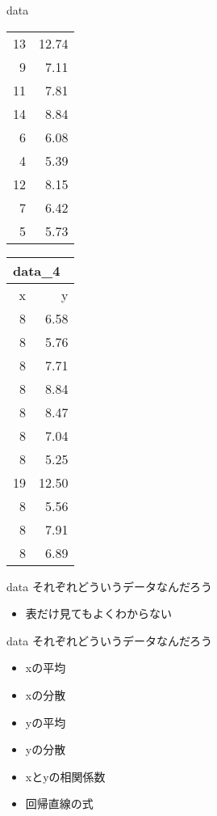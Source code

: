 \documentclass[
  ignorenonframetext,
]{beamer}
\providecommand{\tightlist}{%
  \setlength{\itemsep}{0pt}\setlength{\parskip}{0pt}}
\begin{document}
\begin{frame}{data}
\begin{tabular}{rr}
13 & 12.74\\
9 & 7.11\\
11 & 7.81\\
14 & 8.84\\
6 & 6.08\\
4 & 5.39\\
12 & 8.15\\
7 & 6.42\\
5 & 5.73\\
\bottomrule
\end{tabular}\hfill
\begin{tabular}{rr}
\multicolumn{2}{l}{data\_4}\\
\toprule
x & y\\
\midrule
8 & 6.58\\
8 & 5.76\\
8 & 7.71\\
8 & 8.84\\
8 & 8.47\\
8 & 7.04\\
8 & 5.25\\
19 & 12.50\\
8 & 5.56\\
8 & 7.91\\
8 & 6.89\\
\bottomrule
\end{tabular}
\end{frame}

\begin{frame}{data}
\protect\hypertarget{data-2}{}
それぞれどういうデータなんだろう

\begin{itemize}[<+->]
\tightlist
\item
  表だけ見てもよくわからない
\end{itemize}
\end{frame}

\begin{frame}{data}
\protect\hypertarget{data-3}{}
それぞれどういうデータなんだろう

\begin{itemize}[<+->]
\tightlist
\item
  xの平均
\item
  xの分散
\item
  yの平均
\item
  yの分散
\item
  xとyの相関係数
\item
  回帰直線の式
\end{itemize}
\end{frame}
\end{document}
